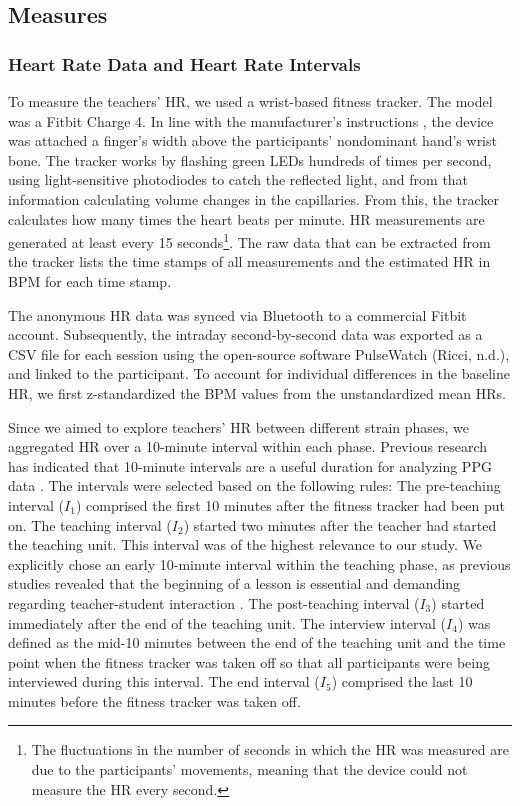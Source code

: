 \documentclass[preprint, 3p,
authoryear]{elsarticle} %
\begin{document}
\subsection{Measures}\label{measures}

\subsubsection{Heart Rate Data and Heart Rate
Intervals}\label{heart-rate-data-and-heart-rate-intervals}

To measure the teachers' HR, we used a wrist-based fitness tracker. The
model was a Fitbit Charge 4. In line with the manufacturer's
instructions \citep{fitbitnd}, the device was attached a finger's width
above the participants' nondominant hand's wrist bone. The tracker works
by flashing green LEDs hundreds of times per second, using
light-sensitive photodiodes to catch the reflected light, and from that
information calculating volume changes in the capillaries. From this,
the tracker calculates how many times the heart beats per minute. HR
measurements are generated at least every 15 seconds\footnote{The
  fluctuations in the number of seconds in which the HR was measured are
  due to the participants' movements, meaning that the device could not
  measure the HR every second.}. The raw data that can be extracted from
the tracker lists the time stamps of all measurements and the estimated
HR in BPM for each time stamp.

The anonymous HR data was synced via Bluetooth to a commercial Fitbit
account. Subsequently, the intraday second-by-second data was exported
as a CSV file for each session using the open-source software PulseWatch
(Ricci, n.d.), and linked to the participant. To account for individual
differences in the baseline HR, we first z-standardized the BPM values
from the unstandardized mean HRs.

Since we aimed to explore teachers' HR between different strain phases,
we aggregated HR over a 10-minute interval within each phase. Previous
research has indicated that 10-minute intervals are a useful duration
for analyzing PPG data \citep{lu2008can}. The intervals were selected
based on the following rules: The pre-teaching interval (\(I_1\))
comprised the first 10 minutes after the fitness tracker had been put
on. The teaching interval (\(I_2\)) started two minutes after the
teacher had started the teaching unit. This interval was of the highest
relevance to our study. We explicitly chose an early 10-minute interval
within the teaching phase, as previous studies revealed that the
beginning of a lesson is essential and demanding regarding
teacher-student interaction
\citep{donker2018quantitative, claessens2017positive}. The post-teaching
interval (\(I_3\)) started immediately after the end of the teaching
unit. The interview interval (\(I_4\)) was defined as the mid-10 minutes
between the end of the teaching unit and the time point when the fitness
tracker was taken off so that all participants were being interviewed
during this interval. The end interval (\(I_5\)) comprised the last 10
minutes before the fitness tracker was taken off.
\end{document}

